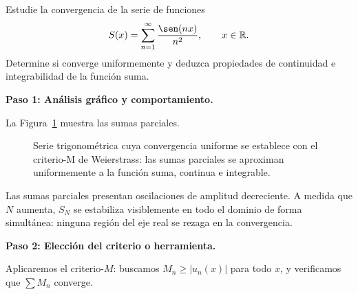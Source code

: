 \begin{example}
Estudie la convergencia de la serie de funciones
\[
    S(x) = \sum_{n=1}^\infty \frac{\sen(nx)}{n^2}, \qquad x \in \mathbb{R}.
\]
Determine si converge uniformemente y deduzca propiedades de
continuidad e integrabilidad de la función suma.

\begin{myproof}
\textbf{Paso 1: Análisis gráfico y comportamiento.}

La Figura~\ref{fig:ssf_serie_trig_M} muestra las sumas parciales.

\begin{figure}[H]
\centering
{}
\caption{Serie trigonométrica cuya convergencia uniforme se establece con el criterio-M de Weierstrass: las sumas parciales se aproximan uniformemente a la función suma, continua e integrable.}
\label{fig:ssf_serie_trig_M}
\end{figure}

Las sumas parciales presentan oscilaciones de amplitud decreciente. A
medida que $N$ aumenta, $S_N$ se estabiliza visiblemente en todo el
dominio de forma simultánea: ninguna región del eje real se rezaga en
la convergencia.

\textbf{Paso 2: Elección del criterio o herramienta.}

Aplicaremos el criterio-$M$: buscamos $M_n \geq |u_n(x)|$ para todo
$x$, y verificamos que $\sum M_n$ converge.


\end{myproof}
\end{example}
